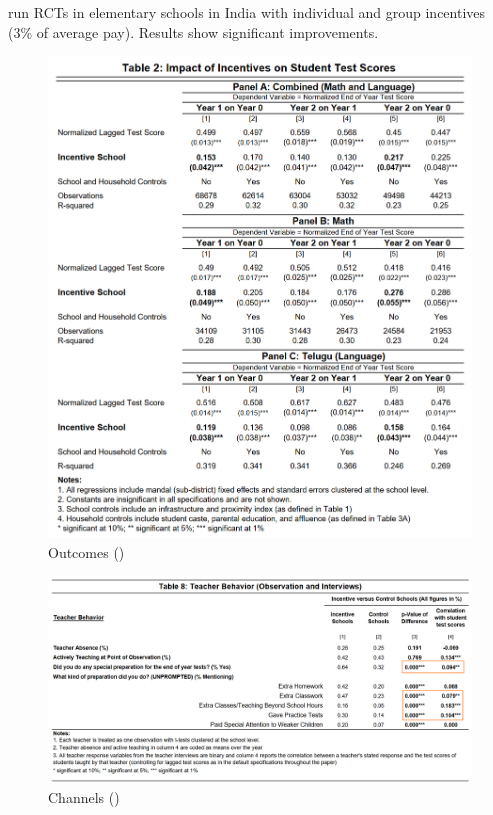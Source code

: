         \subsubsection{\cite{muralidharan_teacher_2011}}

            \cite{muralidharan_teacher_2011} run RCTs in elementary schools in India with individual and group incentives (3\% of average pay). Results show significant improvements.
            \begin{figure}[H]
                \centering
                \includegraphics[width=4.5in]{images/ch10/10 muralidharan 1.png}
                \caption{Outcomes (\cite{muralidharan_teacher_2011})}
            \end{figure}
            \begin{figure}[H]
                \centering
                \includegraphics[width=5in]{images/ch10/10 muralidharan 2.png}
                \caption{Channels (\cite{muralidharan_teacher_2011})}
            \end{figure}
